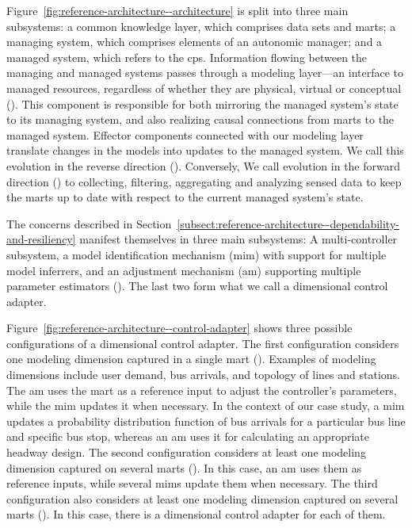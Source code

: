 Figure~\ref{fig:reference-architecture--architecture} is split into three main subsystems: a common knowledge layer, which comprises data sets and \glspl{mart}; a managing system, which comprises elements of an autonomic manager; and a managed system, which refers to the \gls{cps}. Information flowing between the managing and managed systems passes through a modeling layer---an interface to managed resources, regardless of whether they are physical, virtual or conceptual (). This component is responsible for both mirroring the managed system's state to its managing system, and also realizing causal connections from \glspl{mart} to the managed system. Effector components connected with our modeling layer translate changes in the models into updates to the managed system. We call this evolution in the reverse direction (). Conversely, We call evolution in the forward direction () to collecting, filtering, aggregating and analyzing sensed data to keep the \glspl{mart} up to date with respect to the current managed system's state.

The concerns described in Section~\ref{subsect:reference-architecture--dependability-and-resiliency} manifest themselves in three main subsystems: A multi-controller subsystem, a model identification mechanism (\gls{mim}) with support for multiple model inferrers, and an adjustment mechanism (\gls{am}) supporting multiple parameter estimators (). The last two form what we call a dimensional control adapter.

Figure~\ref{fig:reference-architecture--control-adapter} shows three possible configurations of a dimensional control adapter. The first configuration considers one modeling dimension captured in a single \gls{mart} (). Examples of modeling dimensions include user demand, bus arrivals, and topology of lines and stations. The \gls{am} uses the \gls{mart} as a reference input to adjust the controller's parameters, while the \gls{mim} updates it when necessary. In the context of our case study, a \gls{mim} updates a probability distribution function of bus arrivals for a particular bus line and specific bus stop, whereas an \gls{am} uses it for calculating an appropriate headway design. The second configuration considers at least one modeling dimension captured on several \glspl{mart} (). In this case, an \gls{am} uses them as reference inputs, while several \glspl{mim} update them when necessary. The third configuration also considers at least one modeling dimension captured on several \glspl{mart} (). In this case, there is a dimensional control adapter for each of them.

